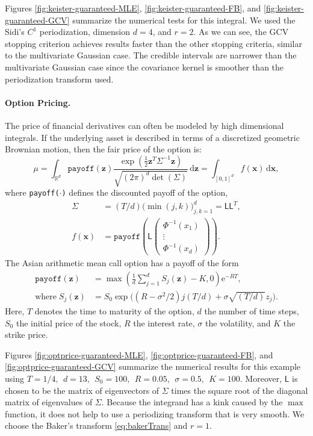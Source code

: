 \documentclass[twocolumn]{svjour3}          %
\newcommand{\bm}[1]{\boldsymbol{#1}}
\newcommand{\mSigma}{\mathsf{\Sigma}}
\newcommand{\dif}[1]{\text{d}{#1}}
\newcommand{\reals}{\mathbb{R}}
\newcommand{\vx}{\bm{x}}
\newcommand{\dvx}{\dif{\bm{x}}}
\newcommand{\vz}{\bm{z}}
\newcommand{\dvz}{\dif{\bm{z}}}
\newcommand{\mL}{\mathsf{L}}
\newcommand{\me}{\mathrm{e}}
\newcommand{\code}[1]{\texttt{#1}}
\begin{document}
Figures \ref{fig:keister-guaranteed-MLE}, \ref{fig:keister-guaranteed-FB}, and \ref{fig:keister-guaranteed-GCV} summarize the numerical tests for this integral.  We used the Sidi's $C^1$ periodization, dimension $d=4$, and $r=2$. 
As we can see, the GCV stopping criterion achieves results faster than the other stopping criteria, similar to the multivariate Gaussian case. The credible intervals are narrower than the multivariate Gaussian case since the covariance kernel is smoother than the periodization transform used.

\paragraph{Option Pricing.}

The price of financial derivatives can often be modeled by high dimensional integrals. If the underlying asset is described in terms of a discretized geometric Brownian motion, then the fair price of the option is:
\begin{equation*}
\mu = \int_{\reals^d} \code{payoff}(\vz) \frac{\exp(\frac 12 \vz^T\mSigma^{-1}\vz)}{\sqrt{(2\pi)^d \det(\mSigma)}} \, \dvz = \int_{[0,1]^d} f(\vx) \, \dvx,
\end{equation*} 
where \code{payoff($\cdot$)} defines the discounted payoff of the option,
\begin{align*}
\mSigma &= (T/d) \bigl(\min(j,k) \bigr)_{j,k=1}^d = \mL \mL^T,\\
f(\vx) &= \code{payoff} \left(\mL 
\begin{pmatrix}
\Phi^{-1}(x_1) \\ \vdots \\ \Phi^{-1}(x_d)
\end{pmatrix} \right).
\end{align*}
The Asian arithmetic mean call option has a payoff of the form
\begin{align*}
\code{payoff}(\vz) &= \max\left( \frac 1d  \sum_{j=1}^d S_j(\vz) - K, 0 \right) \me^{-R T}, \\
\text{where}\;
S_j(\vz) &= S_0 \exp\bigl((R-\sigma^2/2)j(T/d) + \sigma \sqrt{(T/d)} z_j \bigr).
\end{align*}
Here, $T$ denotes the time to maturity of the option, $d$ the number of time steps, $S_0$ the initial price of the stock, $R$ the interest rate, $\sigma$ the volatility, and $K$ the strike price.  

Figures \ref{fig:optprice-guaranteed-MLE}, \ref{fig:optprice-guaranteed-FB}, and 
\ref{fig:optprice-guaranteed-GCV} summarize the numerical results for this example using
$
T = 1/4, \ \ d = 13, \ \ S_0 = 100, \ \ R =  0.05, \ \ \sigma = 0.5, \ \ K = 100.
$
Moreover, $\mL$ is chosen to be the matrix of eigenvectors of $\mSigma$ times the square root of the diagonal matrix of eigenvalues of $\mSigma$. 
Because the integrand has a kink caused by the $\max$ function, it does not help to use a periodizing transform that is very smooth.  We choose the Baker's transform \eqref{eq:bakerTrans} and $r = 1$.
\end{document}
